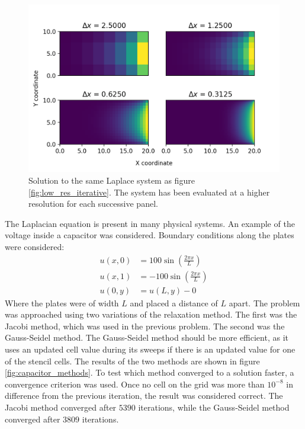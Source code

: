 \documentclass[twocolumn]{article}
\begin{document}
\begin{figure}
\centering
\includegraphics[width=\linewidth]{relaxation}
\caption{Solution to the same Laplace system as figure \ref{fig:low_res_iterative}. The system has been evaluated at a higher resolution for each successive panel.}
\label{fig:relaxation}
\end{figure}

The Laplacian equation is present in many physical systems. An example of the voltage inside a capacitor was considered. Boundary conditions along the plates were considered:
\begin{equation}
\begin{split}
u(x,0) &= 100\sin(\frac{2\pi x}{L}) \\
u(x,1) &= -100\sin(\frac{2\pi x}{L}) \\
u(0,y) &= u(L,y) - 0
\end{split}
\end{equation}
Where the plates were of width $L$ and placed a distance of $L$ apart. The problem was approached using two variations of the relaxation method. The first was the Jacobi method, which was used in the previous problem. The second was the Gauss-Seidel method. The Gauss-Seidel method should be more efficient, as it uses an updated cell value during its sweeps if there is an updated value for one of the stencil cells. The results of the two methods are shown in figure \ref{fig:capacitor_methods}. To test which method converged to a solution faster, a convergence criterion was used. Once no cell on the grid was more than $10^{-8}$ in difference from the previous iteration, the result was considered correct. The Jacobi method converged after $5390$ iterations, while the Gauss-Seidel method converged after $3809$ iterations.
\end{document}
